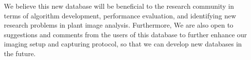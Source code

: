 We believe this new database will be beneficial to the research community in terms of algorithm development, performance evaluation, and identifying new research problems in plant image analysis.
Furthermore, We are also open to suggestions and comments from the users of this database to further enhance our imaging setup and capturing protocol, so that we can develop new databases in the future.

%
%
%

